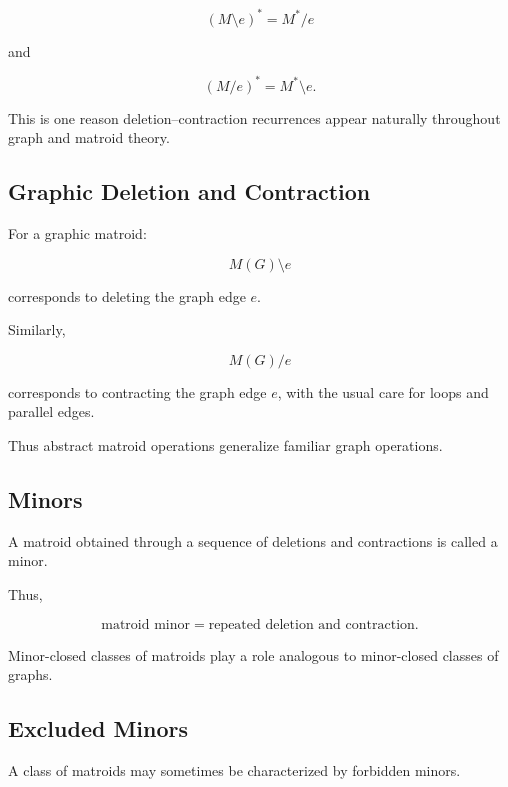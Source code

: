 \[
\boxed{
(M\setminus e)^*
=
M^*/e
}
\]

and

\[
\boxed{
(M/e)^*
=
M^*\setminus e.
}
\]

This is one reason deletion--contraction recurrences appear naturally
throughout graph and matroid theory.

\subsection{Graphic Deletion and Contraction}
\label{subsec:graphic-deletion-contraction}

For a graphic matroid:

\[
M(G)\setminus e
\]

corresponds to deleting the graph edge \(e\).

Similarly,

\[
M(G)/e
\]

corresponds to contracting the graph edge \(e\), with the usual care
for loops and parallel edges.

Thus abstract matroid operations generalize familiar graph operations.

\subsection{Minors}
\label{subsec:matroid-minors}

A matroid obtained through a sequence of deletions and contractions is
called a minor.

Thus,

\[
\boxed{
\text{matroid minor}
=
\text{repeated deletion and contraction}.
}
\]

Minor-closed classes of matroids play a role analogous to minor-closed
classes of graphs.

\subsection{Excluded Minors}
\label{subsec:excluded-minors-matroid}

A class of matroids may sometimes be characterized by forbidden minors.

